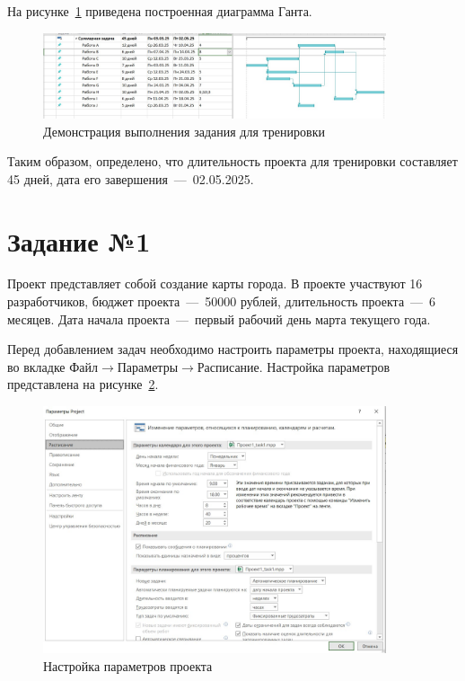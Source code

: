 На рисунке~\ref{fig:test} приведена построенная диаграмма Ганта.

\begin{figure}[H]
	\centering
	\includegraphics[width=0.9\textwidth]{img/test/test.jpg}
	\caption{Демонстрация выполнения задания для тренировки}
	\label{fig:test}
\end{figure}

Таким образом, определено, что длительность проекта для тренировки составляет 45 дней, дата его завершения~---~02.05.2025.

\section{Задание №1}

Проект представляет собой создание карты города.
В проекте участвуют 16 разработчиков, бюджет проекта~---~50000 рублей, длительность проекта~---~6 месяцев.
Дата начала проекта~---~первый рабочий день марта текущего года.

Перед добавлением задач необходимо настроить параметры проекта, находящиеся во вкладке $\text{Файл} \rightarrow \text{Параметры} \rightarrow \text{Расписание}$.
Настройка параметров представлена на рисунке~\ref{fig:parameters}.

\begin{figure}[H]
	\centering
	\includegraphics[width=0.9\textwidth]{img/task1/parameters.jpg}
	\caption{Настройка параметров проекта}
	\label{fig:parameters}
\end{figure}

